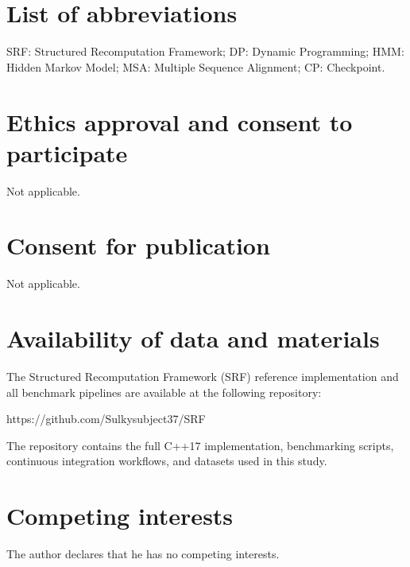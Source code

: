 \documentclass{bmcart}
\begin{document}








\newpage




\begin{backmatter}

\section*{List of abbreviations}
SRF: Structured Recomputation Framework; DP: Dynamic Programming; HMM: Hidden Markov Model; MSA: Multiple Sequence Alignment; CP: Checkpoint.

\section*{Ethics approval and consent to participate}
Not applicable.

\section*{Consent for publication}
Not applicable.

\section*{Availability of data and materials}
The Structured Recomputation Framework (SRF) reference implementation and all benchmark pipelines are available at the following repository:

https://github.com/Sulkysubject37/SRF

The repository contains the full C++17 implementation, benchmarking scripts, continuous integration workflows, and datasets used in this study.

\section*{Competing interests}
The author declares that he has no competing interests.


\end{backmatter}
\end{document}
